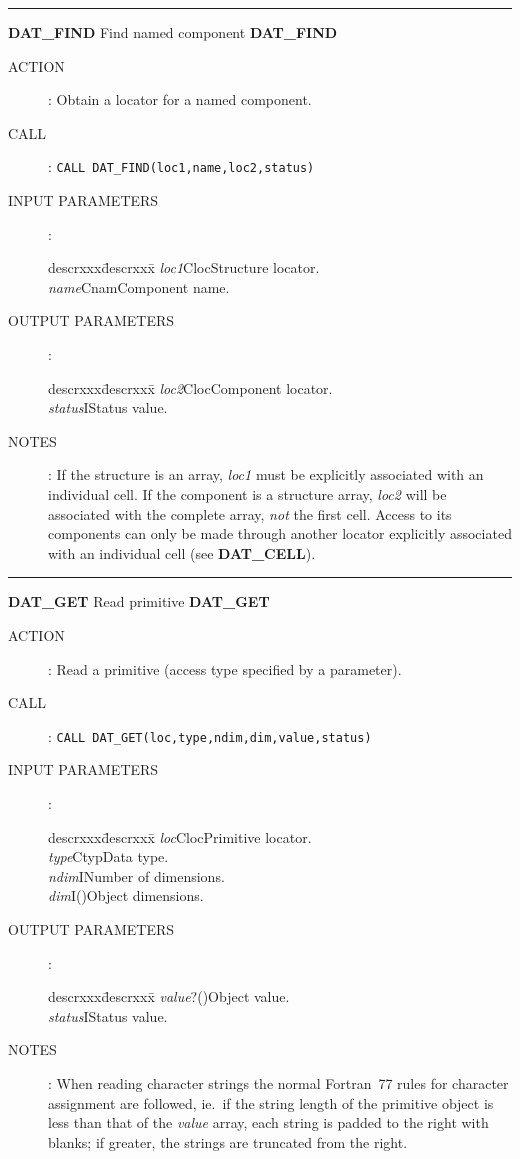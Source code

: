 \rule{\textwidth}{0.3mm}
{\Large {\bf DAT\_FIND} \hfill Find named component \hfill {\bf DAT\_FIND}}
\begin{description}
\item [ACTION]:
Obtain a locator for a named component.
\item [CALL]:
{\tt CALL DAT\_FIND(loc1,name,loc2,status)}
\item [INPUT PARAMETERS]:
\begin{tabbing}
descrxxx\=descrxxx\=\kill
{\em loc1}\>Cloc\>Structure locator.\\
{\em name}\>Cnam\>Component name.
\end{tabbing}
\item [OUTPUT PARAMETERS]:
\begin{tabbing}
descrxxx\=descrxxx\=\kill
{\em loc2}\>Cloc\>Component locator.\\
{\em status}\>I\>Status value.
\end{tabbing}
\item [NOTES]:
If the structure is an array, {\em loc1} must be explicitly associated with an
individual cell.
If the component is a structure array, {\em loc2} will be associated with
the complete array, {\em not} the first cell.
Access to its components can only be made through another locator explicitly
associated with an individual cell (see {\bf DAT\_CELL}).
\end{description}
\goodbreak
\rule{\textwidth}{0.3mm}
{\Large {\bf DAT\_GET} \hfill Read primitive \hfill {\bf DAT\_GET}}
\begin{description}
\item [ACTION]:
Read a primitive (access type specified by a parameter).
\item [CALL]:
{\tt CALL DAT\_GET(loc,type,ndim,dim,value,status)}
\item [INPUT PARAMETERS]:
\begin{tabbing}
descrxxx\=descrxxx\=\kill
{\em loc}\>Cloc\>Primitive locator.\\
{\em type}\>Ctyp\>Data type.\\
{\em ndim}\>I\>Number of dimensions.\\
{\em dim}\>I()\>Object dimensions.
\end{tabbing}
\item [OUTPUT PARAMETERS]:
\begin{tabbing}
descrxxx\=descrxxx\=\kill
{\em value}\>?()\>Object value.\\
{\em status}\>I\>Status value.
\end{tabbing}
\item [NOTES]:
When reading character strings the normal Fortran~77 rules for
character assignment are followed, ie.\ if the string length of the primitive
object is less than that of the {\em value} array, each string is padded to the
right with blanks; if greater, the strings are truncated from the right.
\end{description}
